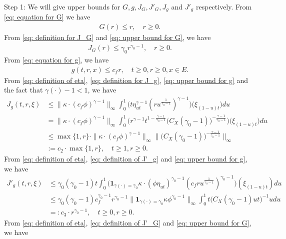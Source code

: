 \documentclass[UTF8]{pkuthss}
\theoremstyle{plain}
\theoremstyle{definition}
\numberwithin{equation}{section}
\begin{document}
	Step 1:
	We will give upper bounds for $G,g, J_G, J'_G, J_g$ and $J'_g$ respectively.
	From \eqref{eq: equation for G} we have
\begin{align}\label{eq: upper bound for G}
	G(r)
	\leq r,
	\quad r \geq 0.
\end{align}	
	From \eqref{eq: definition for J_G} and \eqref{eq: upper bound for G}, we have
\begin{align}\label{eq: upper bound for J_G}
	J_G(r)
	\leq \gamma_0 r^{\gamma_0 - 1},
	\quad r \geq 0.
\end{align}
	From \eqref{eq: equation for g}, we have
\begin{align}\label{eq: upper bound for g}
	g(t,r, x) \leq c_f r,
	\quad t\geq 0, r \geq 0, x\in E.
\end{align}
	From \eqref{eq: definition of eta}, \eqref{eq: definition for J_g}, \eqref{eq: upper bound for g} and the fact that $\gamma(\cdot) - 1 < 1$, we have
\begin{align}
	J_g(t,r, \xi)
	&\leq \|\kappa \cdot (c_f\phi)^{\gamma - 1} \|_\infty \int_0^1 \big(  t\eta_{ut}^{\gamma - 1} (ru^{\frac{1}{\gamma_0 - 1}} )^{\gamma-1}  \big) \big(  \xi_{(1-u)t} \big) du
	\\&= \| \kappa \cdot (c_f\phi)^{\gamma - 1} \|_\infty \int_0^1 \big(  r^{\gamma - 1}t^{1-\frac{\gamma - 1}{\gamma_0 - 1}}  \big( C_X (\gamma_0 - 1) \big)^{-\frac{\gamma - 1}{\gamma_0 - 1}}  \big) \big( \xi_{(1-u)t} \big) du
	\\& \leq \max\{1,r\} \cdot \| \kappa \cdot (c_f\phi)^{\gamma - 1} \|_\infty \Big\|  \big( C_X (\gamma_0 - 1) \big)^{-\frac{\gamma - 1}{\gamma_0 - 1}}\Big\|_\infty
	\\& := c_2 \cdot \max  \{1,r\},
	\quad t\geq 1, r\geq 0.
\end{align}
	From \eqref{eq: definition of eta}, \eqref{eq: definition of J'_g} and \eqref{eq: upper bound for g}, we have
\begin{align}
	J'_g(t,r,\xi)
	&\leq \gamma_0 (\gamma_0 - 1) t \int_0^1 \big( \mathbf 1_{\gamma(\cdot) = \gamma_0} \kappa \cdot (\phi \eta_{ut})^{\gamma_0 - 1} (c_f ru^{\frac{1}{\gamma_0 - 1}})^{\gamma_0 - 1}\big) (\xi_{(1-u)t}) du
	\\&\leq \gamma_0(\gamma_0 - 1) c_f^{\gamma_0 - 1}r^{\gamma_0 - 1} \|  \mathbf 1_{\gamma(\cdot) = \gamma_0}  \kappa \phi^{\gamma_0 - 1} \|_\infty \int_0^1 t \big( C_X(\gamma_0 - 1) ut \big)^{- 1}  u  du
	\\&=: c_3 \cdot r^{\gamma_0 - 1},
	\quad t\geq 0, r\geq 0.
\end{align}
	From \eqref{eq: definition of eta}, \eqref{eq: definition of J'_G} and \eqref{eq: upper bound for G}, we have
\end{document}

